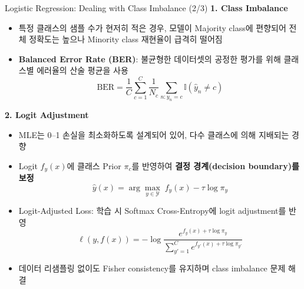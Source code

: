 \documentclass[xcolor=dvipsnames,t,9pt]{beamer}
\begin{document}
\begin{frame}{Logistic Regression: Dealing with Class Imbalance (2/3)}
    \vspace{-0.5em}
    \textbf{1. Class Imbalance}
    \begin{itemize}
        \item 특정 클래스의 샘플 수가 현저히 적은 경우, 모델이 Majority class에 편향되어 전체 정확도는 높으나 Minority class 재현율이 급격히 떨어짐
        \item \textbf{Balanced Error Rate (BER)}: 불균형한 데이터셋의 공정한 평가를 위해 클래스별 에러율의 산술 평균을 사용
        \[ \text{BER} = \frac{1}{C} \sum_{c=1}^{C} \frac{1}{N_c} \sum_{n:y_n=c} \mathbb{I}(\hat{y}_n \neq c) \]
    \end{itemize}

    \textbf{2. Logit Adjustment}
    \begin{itemize}
        \item MLE는 0–1 손실을 최소화하도록 설계되어 있어, 다수 클래스에 의해 지배되는 경향
        \item Logit $f_y(x)$에 클래스 Prior $\pi_c$를 반영하여 \textbf{결정 경계(decision boundary)를 보정}
        \[
        \hat{y}(x)
        = \arg\max_{y \in \mathcal{Y}} \; f_y(x) - \tau \log \pi_y
        \]
        \item Logit-Adjusted Loss: 학습 시 Softmax Cross-Entropy에 logit adjustment를 반영
        \[
        \ell(y, f(x))
        = - \log
        \frac{e^{f_y(x) + \tau \log \pi_y}}
        {\sum_{y'=1}^{C} e^{f_{y'}(x) + \tau \log \pi_{y'}}}
        \]
        \item 데이터 리샘플링 없이도 Fisher consistency를 유지하며 class imbalance 문제 해결
    \end{itemize}
\end{frame}

\end{document}
